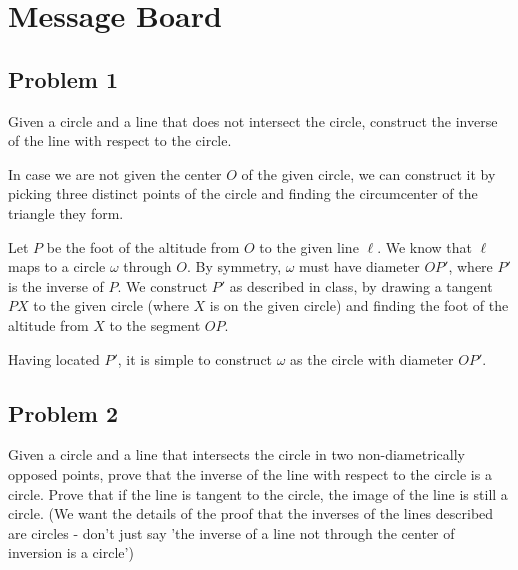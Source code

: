 \section{Message Board}

\subsection{Problem 1}
Given a circle and a line that does not intersect the circle, construct the inverse of the line with respect to the circle.

\begin{mdsoln}
In case we are not given the center $O$ of the given circle, we can construct it by picking three distinct points of the circle and finding the circumcenter of the triangle they form.

Let $P$ be the foot of the altitude from $O$ to the given line $\ell$. We know that $\ell$ maps to a circle $\omega$ through $O$. By symmetry, $\omega$ must have diameter $OP'$, where $P'$ is the inverse of $P$. We construct $P'$ as described in class, by drawing a tangent $PX$ to the given circle (where $X$ is on the given circle) and finding the foot of the altitude from $X$ to the segment $OP$.

Having located $P'$, it is simple to construct $\omega$ as the circle with diameter $OP'$.
    
\end{mdsoln}

\subsection{Problem 2}
Given a circle and a line that intersects the circle in two non-diametrically opposed points, prove that the inverse of the line with respect to the circle is a circle. Prove that if the line is tangent to the circle, the image of the line is still a circle. (We want the details of the proof that the inverses of the lines described are circles - don't just say 'the inverse of a line not through the center of inversion is a circle')

